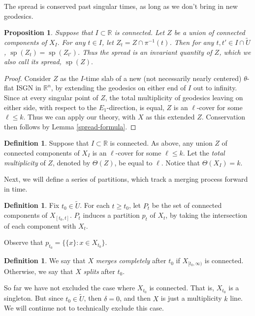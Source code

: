 \documentclass[11pt,reqno,twoside]{amsart}
\DeclareMathOperator{\spread}{\mathrm{sp}}
\newtheorem{proposition}[lemma]{Proposition}
\theoremstyle{definition}
\newtheorem{definition}[lemma]{Definition}
\begin{document}
The spread is conserved past singular times, as long as we don't bring in new geodesics.

\begin{proposition}
    Suppose that $I \subset \mathbb{R}$ is connected. Let $Z$ be a union of connected components of $X_I.$ For any $t \in I$, let $Z_t = Z \cap \pi^{-1}(t)$. Then for any $t,t' \in I \cap \tilde U$, $\spread(Z_t) = \spread(Z_{t'})$. Thus the spread is an invariant quantity of $Z$, which we also call its spread, $\spread(Z).$
\end{proposition}

\begin{proof}
    Consider $Z$ as the $I$-time slab of a new (not necessarily nearly centered) $\theta$-flat ISGN in $\mathbb{R}^n$, by extending the geodesics on either end of $I$ out to infinity. Since at every singular point of $Z$, the total multiplicity of geodesics leaving on either side, with respect to the $E_1$-direction, is equal, $Z$ is an $\ell$-cover for some $\ell \leq k$. Thus we can apply our theory, with $X$ as this extended $Z$. Conservation then follows by Lemma \ref{spread-formula}. 
\end{proof}

\begin{definition}
    Suppose that $I \subset \mathbb{R}$ is connected. As above, any union $Z$ of connected components of $X_I$ is an $\ell$-cover for some $\ell \leq k$. Let the \emph{total multiplicity} of $Z$, denoted by $\Theta(Z)$, be equal to $\ell$. Notice that $\Theta(X_I) = k.$
\end{definition}

Next, we will define a series of partitions, which track a merging process forward in time.

\begin{definition}
    Fix $t_0 \in \tilde U$. For each $t \geq t_0$, let $P_t$ be the set of connected components of $X_{[t_0,t]}$. $P_t$ induces a partition $p_t$ of $X_t$, by taking the intersection of each component with $X_t$.
\end{definition}

Observe that $p_{t_0} = \{\{x\}: x \in X_{t_0}\}.$ 

\begin{definition}
    We say that $X$ \emph{merges completely} after $t_0$ if $X_{[t_0,\infty)}$ is connected. Otherwise, we say that $X$ \emph{splits} after $t_0.$
\end{definition}

So far we have not excluded the case where $X_{t_0}$ is connected. That is, $X_{t_0}$ is a singleton. But since $t_0 \in \tilde U$, then $\delta = 0$, and then $X$ is just a multiplicity $k$ line. We will continue not to technically exclude this case.
\end{document}
